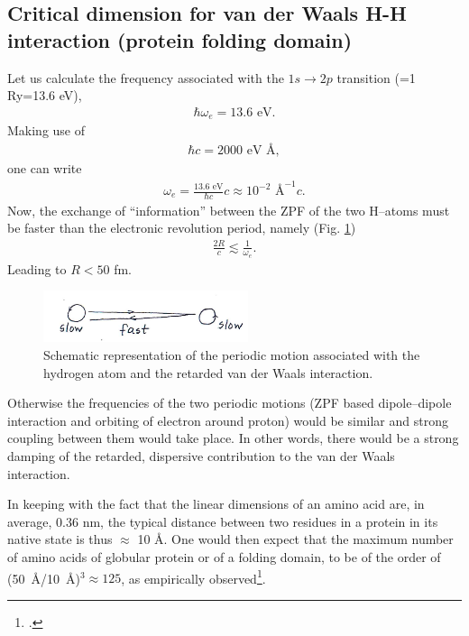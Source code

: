\begin{subappendices}
 \subsection{Critical dimension for van der Waals H-H interaction (protein folding domain)}
 Let us calculate the frequency associated with the $1s\to 2p$ transition (=1 Ry=13.6 eV),
 \begin{align}\label{eq2.D.22}
\hbar\omega_e=13.6\text{ eV}.    
 \end{align} 
 Making use of
 \begin{align}\label{eq2.D.23}
 \hbar c=2000\text{ eV \AA},
 \end{align} 
 one can write
 \begin{align}\label{eq2.D.24}
 \omega_e=\frac{13.6\text{ eV}}{\hbar c}c\approx 10^{-2}\text{ \AA}^{-1}c.
 \end{align} 
 Now, the exchange of ``information'' between the ZPF of the two H--atoms must be faster than the electronic revolution period, namely (Fig. \ref{fig2.D.6})
  \begin{align}\label{eq2.D.25}
  \frac{2R}{c}\lesssim\frac{1}{\omega_e}.
  \end{align} 
  Leading to $R<50$ fm.
       \begin{figure}[h]
        \centerline{\includegraphics*[width=6cm,angle=0]{nutshell/figs/fig2D6.pdf}}
        \caption{Schematic representation of the periodic motion associated with the hydrogen atom and the retarded van der Waals interaction.}\label{fig2.D.6}
        \end{figure}
 
 Otherwise the frequencies of the two periodic motions (ZPF based dipole--dipole interaction and orbiting of electron around proton) would be similar and strong coupling between them would take place. In other words, there would be a strong damping of the retarded, dispersive contribution to the van der Waals interaction.
 
 In keeping with the fact that the linear dimensions of an amino acid are, in average, 0.36 nm, the typical distance between two residues in a protein in its native state is thus $\approx$ 10 \AA. One would then expect that the maximum number of amino acids of globular protein or of a folding domain, to be of the order of \mbox{(50 \AA/10 \AA)$^{3}\approx 125$}, as empirically observed\footnote{\cite{Rost:97}.}.

\end{subappendices}
